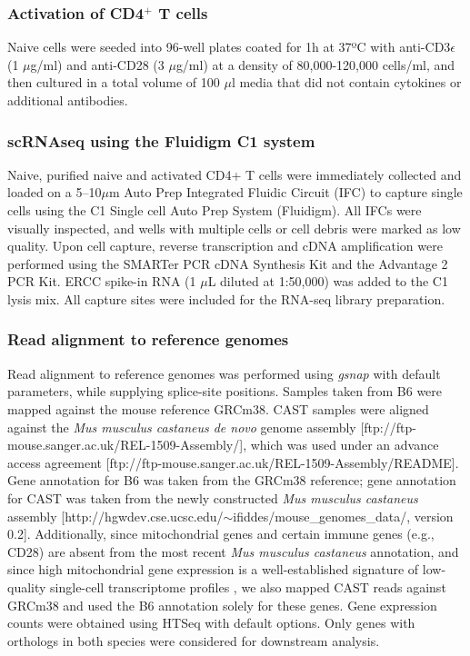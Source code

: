 \subsubsection*{Activation of CD4$^+$ T cells}

Naive cells were seeded into 96-well plates coated for 1h at 37ºC with anti-CD3$\epsilon$ (1 $\mu$g/ml) and anti-CD28 (3 $\mu$g/ml) at a density of 80,000-120,000 cells/ml, and then cultured in a total volume of 100 $\mu$l media that did not contain cytokines or additional antibodies.

\subsubsection*{scRNAseq using the Fluidigm C1 system}

Naive, purified naive and activated CD4+ T cells were immediately collected and loaded on a 5–10$\mu$m Auto Prep Integrated Fluidic Circuit (IFC) to capture single cells using the C1 Single cell Auto Prep System (Fluidigm). All IFCs were visually inspected, and wells with multiple cells or cell debris were marked as low quality. Upon cell capture, reverse transcription and cDNA amplification were performed using the SMARTer PCR cDNA Synthesis Kit and the Advantage 2 PCR Kit. ERCC spike-in RNA (1 $\mu$L diluted at 1:50,000) was added to the C1 lysis mix. All capture sites were included for the RNA-seq library preparation.

\subsubsection*{Read alignment to reference genomes}

Read alignment to reference genomes was performed using \emph{gsnap} with default parameters, while supplying splice-site positions. Samples taken from B6 were mapped against the mouse reference GRCm38. CAST samples were aligned against the \emph{Mus musculus castaneus de novo} genome assembly [ftp://ftp-mouse.sanger.ac.uk/REL-1509-Assembly/], which was used under an advance access agreement [ftp://ftp-mouse.sanger.ac.uk/REL-1509-Assembly/README]. Gene annotation for B6 was taken from the GRCm38 reference; gene annotation for CAST was taken from the newly constructed \emph{Mus musculus castaneus} assembly [http://hgwdev.cse.ucsc.edu/$\sim$ifiddes/mouse\_{}genomes\_{}data/, version 0.2]. Additionally, since mitochondrial genes and certain immune genes (e.g., CD28) are absent from the most recent \emph{Mus musculus castaneus} annotation, and since high mitochondrial gene expression is a well-established signature of low-quality single-cell transcriptome profiles \citep{Ilicic2016}, we also mapped CAST reads against GRCm38 and used the B6 annotation solely for these genes. Gene expression counts were obtained using HTSeq with default options. Only genes with orthologs in both species were considered for downstream analysis. 

